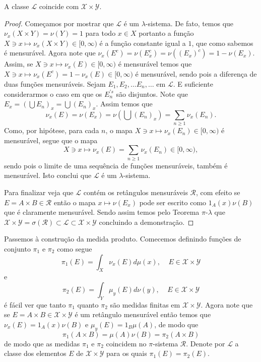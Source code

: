 \begin{proposicao}\label{Mens. Prod}
A classe $\mathscr{L}$ coincide com $\mathscr{X}\times \mathscr{Y}$.
\end{proposicao}
\begin{proof}
Começamos por mostrar que $\mathscr{L}$ é um $\lambda$-sistema. De fato, temos que
$\nu_x(X\times Y)=\nu(Y)=1$ para todo $x\in X$ portanto
 a função $X\ni x\mapsto \nu_x(X\times Y)\in [0,\infty)$ é a função constante
igual a $1$, que como sabemos é mensurável.
  Agora note que $\nu_x(E^c)=\nu(E^c_x)=\nu((E_x)^c)=1-\nu(E_x).$
 Assim, se $X\ni x\mapsto \nu_x(E)\in [0, \infty)$  é mensurável temos que 
 $X\ni x\mapsto \nu_x(E^c)=1-\nu_x(E)\in [0, \infty)$ é mensurável, sendo pois 
 a diferença de duas funções mensuráveis.
  Sejam $E_1, E_2, \ldots E_n, \ldots$ em $\mathscr{L}.$ E suficiente 
  considerarmos o caso em que os $E_n^{'s}$ são disjuntos. Note que $E_x=(\bigcup E_n)_x=\bigcup (E_n)_x$. Assim temos que 
  $$
  \nu_x(E)=\nu(E_x)=\nu(\bigcup (E_n)_x)=\sum_{n\geq 1}\nu_x(E_n).
  $$
  Como, por hipótese, para cada $n$, o mapa $X\ni x\mapsto \nu_x(E_n)\in [0,\infty)$ é mensurável, segue que 
  o mapa 
  $$
 X\ni x\mapsto \nu_x(E)=\sum_{n\geq 1}\nu_x(E_n)\in [0,\infty),
 $$ 
 sendo pois o limite de uma sequência de funções mensuráveis, também é mensurável. Isto conclui que $\mathscr{L}$ é um $\lambda$-sistema.
 
 Para finalizar veja  que $\mathscr{L}$ contém os retângulos mensuráveis $\mathscr{R}$, com efeito se $E=A\times B\in \mathscr{R}$ então o mapa $x\mapsto \nu(E_x)$ pode ser escrito como $1_A(x)\nu(B)$ que é claramente mensurável. Sendo assim temos pelo Teorema $\pi$-$\lambda$ que $\mathscr{X}\times \mathscr{Y}= \sigma(\mathscr{R})\subset \mathscr{L}\subset \mathscr{X}\times \mathscr{Y}$ concluindo a demonstração.
\end{proof}
\medskip


Passemos à construção da medida produto. Comecemos definindo funções de conjunto $\pi_1$ e $\pi_2$ como segue
\begin{equation}\label{M.Prod. 1}
\pi_1(E)=\int_X \nu_x(E) d\mu(x),~~~~~E \in \mathscr{X}\times \mathscr{Y}
\end{equation}
e 
\begin{equation}\label{M. Prod. 2}
\pi_2(E)=\int_Y \mu_y(E)d\nu(y),~~~~~E \in \mathscr{X}\times \mathscr{Y}
\end{equation}
é fácil ver que tanto $\pi_1$ quanto $\pi_2$ são medidas finitas em $\mathscr{X}\times \mathscr{Y}$. Agora note que se $E=A\times B\in\mathscr{X}\times \mathscr{Y}$  é um retângulo mensurável então temos que  $\nu_x(E)=1_A(x)\nu(B)$ e $\mu_y(E)=1_B\mu(A)$, de modo que 
\begin{equation}
\pi_1(A\times B)=\mu(A)\nu(B)=\pi_2(A\times B)
\end{equation}
de modo que as medidas $\pi_1$ e $\pi_2$ coincidem no $\pi$-sistema $\mathscr{R}$.  Denote por $\mathscr{L}$ a classe dos elementos $E$ de 
$\mathscr{X}\times \mathscr{Y}$  para os quais $\pi_1(E)=\pi_2(E)$.

